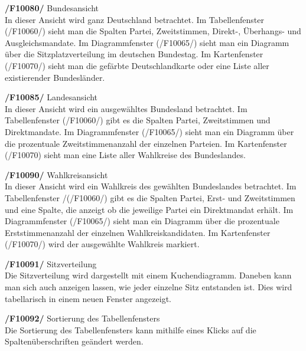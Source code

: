 \documentclass[10pt,a4paper]{article}
\begin{document}
\begin{description}
	\item \textbf{/F10080/} Bundesansicht \hfill \\
	In dieser Ansicht wird ganz Deutschland betrachtet. Im Tabellenfenster (/F10060/) sieht man die Spalten Partei, Zweitstimmen, Direkt-, Überhangs- und Ausgleichsmandate. Im Diagrammfenster (/F10065/) sieht man ein Diagramm über die Sitzplatzverteilung im deutschen Bundestag. Im Kartenfenster (/F10070/) sieht man die gefärbte Deutschlandkarte oder eine Liste aller existierender Bundesländer. \hfill \\
	\item \textbf{/F10085/} Landesansicht \hfill \\
	In dieser Ansicht wird ein ausgewähltes Bundesland betrachtet. Im Tabellenfenster (/F10060/) gibt es die Spalten Partei, Zweitstimmen und Direktmandate. Im Diagrammfenster (/F10065/) sieht man ein Diagramm über die prozentuale Zweitstimmenanzahl der einzelnen Parteien. Im Kartenfenster (/F10070) sieht man eine Liste aller Wahlkreise des Bundeslandes. \hfill \\
	\item \textbf{/F10090/} Wahlkreisansicht \hfill \\
	In dieser Ansicht wird ein Wahlkreis des gewählten Bundeslandes betrachtet. Im Tabellenfenster /(/F10060/) gibt es die  Spalten Partei, Erst- und Zweitstimmen und eine Spalte, die anzeigt ob die jeweilige Partei ein Direktmandat erhält. Im Diagrammfenster (/F10065/) sieht man ein Diagramm über die prozentuale Erststimmenanzahl der einzelnen Wahlkreiskandidaten. Im Kartenfenster (/F10070/) wird der ausgewählte Wahlkreis markiert. \hfill \\
	\item \textbf{/F10091/} Sitzverteilung \hfill \\
	Die Sitzverteilung wird dargestellt mit einem Kuchendiagramm. Daneben kann man sich auch anzeigen lassen, wie jeder einzelne Sitz entstanden ist. Dies wird tabellarisch in einem neuen Fenster angezeigt. \hfill \\
	\item \textbf{/F10092/} Sortierung des Tabellenfensters \hfill \\
	Die Sortierung des Tabellenfensters kann mithilfe eines Klicks auf die Spaltenüberschriften geändert werden. \hfill \\
\end{description}
\end{document}
